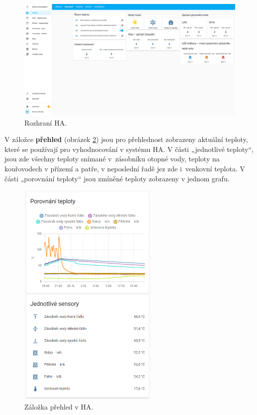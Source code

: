 \begin{figure}[H]
    \centering
    \includegraphics[width=\textwidth]{images/software-ha/prehled-ha.png}
    \caption{Rozhraní HA.}
    \label{fig:prehled-ha}
\end{figure}

V záložce \textbf{přehled} (obrázek \ref{fig:zalozka-prehled}) jsou pro přehlednost zobrazeny aktuální teploty, které se používají pro vyhodnocování v systému HA. V části „jednotlivé teploty“, jsou zde všechny teploty snímané v~zásobníku otopné vody, teploty na kouřovodech v přízemí a patře, v neposlední řadě jez zde i~venkovní teplota. V části „porovnání teploty“ jsou zmíněné teploty zobrazeny v jednom grafu.

\begin{figure}[H]
    \centering
    \includegraphics[width=0.6\textwidth]{images/software-ha/zalozka-prehled.png}
    \caption{Záložka přehled v HA.}
    \label{fig:zalozka-prehled}
\end{figure}

